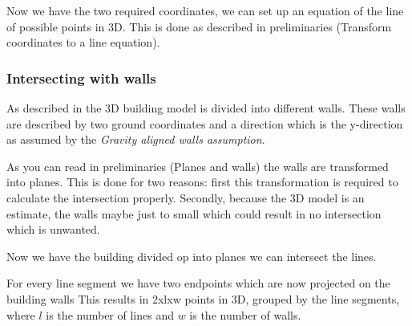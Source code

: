

	Now we have the two required coordinates, we can set up an equation of the
	line of possible points in 3D.
	This is done as described in preliminaries (Transform coordinates to a line equation). 

	\subsubsection{Intersecting with walls}


	As described in %
	 the 3D building model is divided into different walls. These walls are
	 described by two ground coordinates and a direction which is the y-direction as
	 assumed by the \emph{Gravity aligned walls assumption}.

	As you can read in preliminaries (Planes and walls) the walls are transformed
	into planes.  This is done for two reasons: first this transformation is required to calculate the intersection properly.
	Secondly, because the 3D model is an estimate, the walls maybe just
	to small which could %
	result in no intersection which is unwanted.

	Now we have the building divided op into planes we can intersect the lines.

	For every line segment we have two endpoints which are now projected on the
	building walls
	This results in 2xlxw points in 3D, grouped by the line segments, where $l$ is the number
	of lines and $w$ is the number of walls. 

